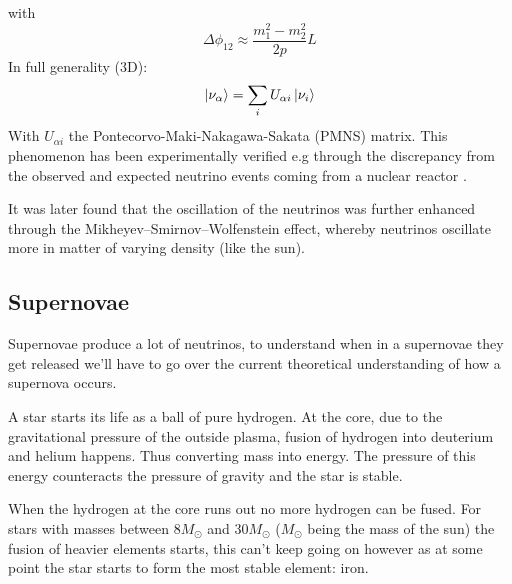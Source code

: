 with
\begin{equation}
	\Delta \phi_{12} \approx \frac{m_1^2 - m_2^2}{2p}L
\end{equation}
In full generality (3D):
\begin{equation}
	\ket{\nu_\alpha} = \sum_iU_{\alpha i} \ket{\nu_i}
\end{equation}
With $U_{\alpha i}$ the Pontecorvo-Maki-Nakagawa-Sakata (PMNS) matrix\cite{1962PThPh..28..870M}.  This
phenomenon has been experimentally verified e.g through the discrepancy from
the observed and expected neutrino events coming from a nuclear reactor \cite{Eguchi_2003}.

It was later found that the oscillation of the neutrinos was further enhanced
through the Mikheyev–Smirnov–Wolfenstein effect, whereby neutrinos oscillate
more in matter of varying density (like the
sun)\cite{smirnov2019mikheyevsmirnovwolfenstein}.
\subsection{Supernovae}
\label{sec:supernovae}
Supernovae produce a lot of neutrinos, to understand when in a supernovae they get released
we'll have to go over the current theoretical understanding of how a supernova occurs. 

A star starts its life as a ball of pure hydrogen. At the core, due to the
gravitational pressure of the outside plasma, fusion of hydrogen into deuterium
and helium happens. Thus converting mass into energy. The pressure of this energy
counteracts the pressure of gravity and the star is stable.

When the hydrogen at the core runs out no more hydrogen can be fused. For stars
with masses between $8M_\odot$ and $30M_\odot$ ($M_\odot$ being the mass of the sun)
the fusion of heavier elements starts, this can't keep going on however as at
some point the star starts to form the most stable element: iron. 


